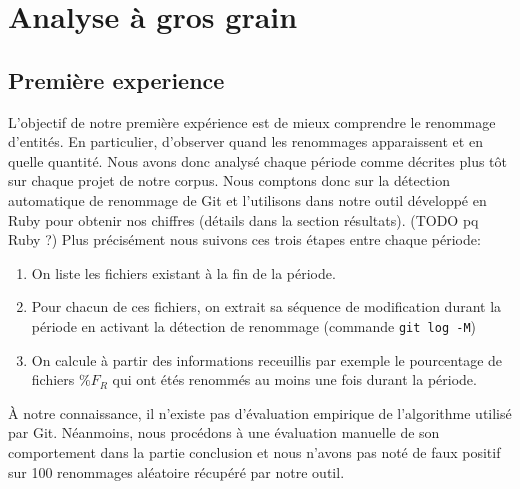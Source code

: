 \section{Analyse à gros grain}
\label{sec:analyse_gros_grain}

\subsection{Première experience}
L'objectif de notre première expérience est de mieux comprendre le renommage d'entités. En particulier, d'observer quand les renommages apparaissent et en quelle quantité. Nous avons donc analysé chaque période comme décrites plus tôt sur chaque projet de notre corpus. Nous comptons donc sur la détection automatique de renommage de Git et l'utilisons dans notre outil développé en Ruby pour obtenir nos chiffres (détails dans la section résultats). (TODO pq Ruby ?) Plus précisément nous suivons ces trois étapes entre chaque période:\\
\begin{enumerate}
\item On liste les fichiers existant à la fin de la période.
\item Pour chacun de ces fichiers, on extrait sa séquence de modification durant la période en activant la détection de renommage (commande \texttt{git log -M})
\item On calcule à partir des informations receuillis par exemple le pourcentage de fichiers $\%F_{R}$ qui ont étés renommés au moins une fois durant la période.
\end{enumerate}

À notre connaissance, il n'existe pas d'évaluation empirique de l'algorithme utilisé par Git. Néanmoins, nous procédons à une évaluation manuelle de son comportement dans la partie conclusion et nous n'avons pas noté de faux positif sur 100 renommages aléatoire récupéré par notre outil. \\

